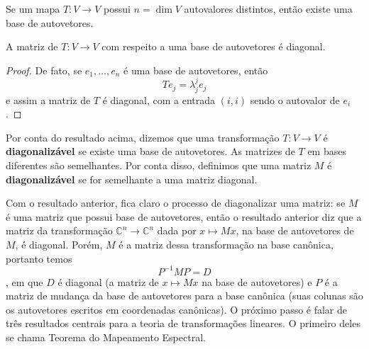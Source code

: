 \begin{corollary}
    Se um mapa $T \colon V \to V$ possui $n = \dim V$ autovalores distintos, então existe uma base de autovetores.
\end{corollary}

\begin{proposition}
    A matriz de $T \colon V \to V$ com respeito a uma base de autovetores é diagonal.
\end{proposition}
\begin{proof}
    De fato, se $e_1, \dots, e_n$ é uma base de autovetores, então \begin{equation}
        Te_j = \lambda_j^j e_j
    \end{equation} e assim a matriz de $T$ é diagonal, com a entrada $(i,i)$ sendo o autovalor de $e_i$.
\end{proof}

Por conta do resultado acima, dizemos que uma transformação $T \colon V \to V$ é \textbf{diagonalizável} se existe uma base de autovetores. As matrizes de $T$ em bases diferentes são semelhantes. Por conta disso, definimos que uma matriz $M$ é \textbf{diagonalizável} se for semelhante a uma matriz diagonal.

Com o resultado anterior, fica claro o processo de diagonalizar uma matriz: se $M$ é uma matriz que possui base de autovetores, então o resultado anterior diz que a matriz da transformação $\mathbb{C}^n \to \mathbb{C}^n$ dada por $x \mapsto Mx$, na base de autovetores de $M$, é diagonal. Porém, $M$ é a matriz dessa transformação na base canônica, portanto temos \begin{equation}
    P^{-1}MP = D
\end{equation}, em que $D$ é diagonal (a matriz de $x \mapsto Mx$ na base de autovetores) e $P$ é a matriz de mudança da base de autovetores para a base canônica (suas colunas são os autovetores escritos em coordenadas canônicas). O próximo passo é falar de três resultados centrais para a teoria de transformações lineares. O primeiro deles se chama Teorema do Mapeamento Espectral.

